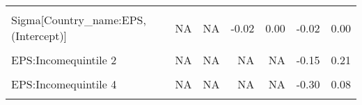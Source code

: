 \begin{table}
\begin{tabular}[t]{lrrrrrr}
\cellcolor{gray!10}{b[EPS Country\_name:US]} & \cellcolor{gray!10}{NA} & \cellcolor{gray!10}{NA} & \cellcolor{gray!10}{-0.12} & \cellcolor{gray!10}{0.08} & \cellcolor{gray!10}{-0.11} & \cellcolor{gray!10}{0.08}\\
Sigma[Country\_name:EPS,(Intercept)] & NA & NA & -0.02 & 0.00 & -0.02 & 0.00\\
\cellcolor{gray!10}{Sigma[Country\_name:EPS,EPS]} & \cellcolor{gray!10}{NA} & \cellcolor{gray!10}{NA} & \cellcolor{gray!10}{0.00} & \cellcolor{gray!10}{0.02} & \cellcolor{gray!10}{0.00} & \cellcolor{gray!10}{0.02}\\
EPS:Incomequintile 2 & NA & NA & NA & NA & -0.15 & 0.21\\
\cellcolor{gray!10}{EPS:Incomequintile 3} & \cellcolor{gray!10}{NA} & \cellcolor{gray!10}{NA} & \cellcolor{gray!10}{NA} & \cellcolor{gray!10}{NA} & \cellcolor{gray!10}{-0.32} & \cellcolor{gray!10}{0.05}\\
EPS:Incomequintile 4 & NA & NA & NA & NA & -0.30 & 0.08\\
\cellcolor{gray!10}{EPS:Incomequintile 5} & \cellcolor{gray!10}{NA} & \cellcolor{gray!10}{NA} & \cellcolor{gray!10}{NA} & \cellcolor{gray!10}{NA} & \cellcolor{gray!10}{-0.13} & \cellcolor{gray!10}{0.24}\\
\bottomrule
\end{tabular}
\end{table}
